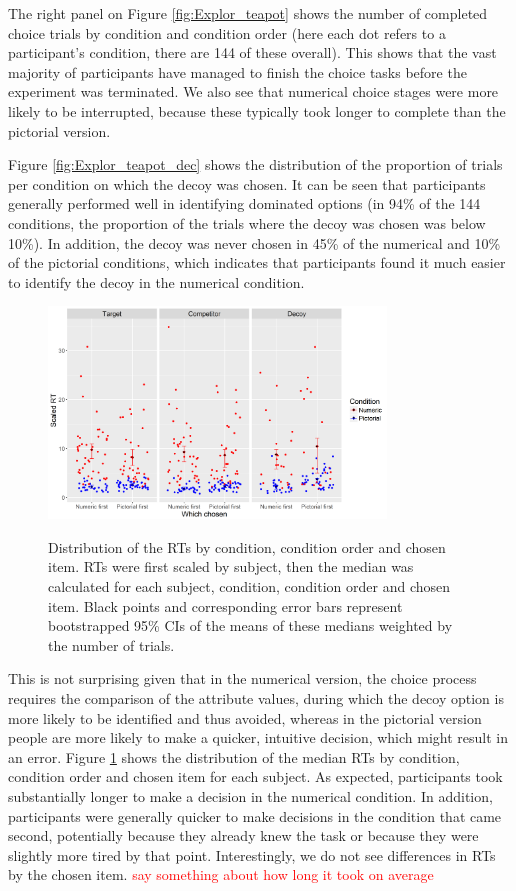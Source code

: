 \documentclass[11pt,a4paper]{article}
\begin{document}
The right panel on Figure \ref{fig:Explor_teapot} shows the number of completed choice trials by condition and condition order (here each dot refers to a participant's condition, there are 144 of these overall). This shows that the vast majority of participants have managed to finish the choice tasks before the experiment was terminated. We also see that numerical choice stages were more likely to be interrupted, because these typically took longer to complete than the pictorial version.



Figure \ref{fig:Explor_teapot_dec} shows the distribution of the proportion of trials per condition on which the decoy was chosen. It can be seen that participants generally performed well in identifying dominated options (in 94\% of the 144 conditions, the proportion of the trials where the decoy was chosen was below 10\%). In addition, the decoy was never chosen in 45\% of the numerical and 10\% of the pictorial conditions, which indicates that participants found it much easier to identify the decoy in the numerical condition.


 \begin{figure}
\centering
\caption{Distribution of the RTs by condition, condition order and chosen item. RTs were first scaled by subject, then the median was calculated for each subject, condition, condition order and chosen item. Black points and corresponding error bars represent bootstrapped 95\% CIs of the means of these medians weighted by the number of trials.}
\includegraphics[width=0.8\textwidth]{Teapot_rts.png}
\label{fig:Teapot_rts}
\end{figure} 

 This is not surprising given that in the numerical version, the choice process requires the comparison of the attribute values, during which the decoy option is more likely to be identified and thus avoided, whereas in the pictorial version people are more likely to make a quicker, intuitive decision, which might result in an error. Figure \ref{fig:Teapot_rts} shows the distribution of the median RTs by condition, condition order and chosen item for each subject. As expected, participants took substantially longer to make a decision in the numerical condition. In addition, participants were generally quicker to make decisions in the condition that came second, potentially because they already knew the task or because they were slightly more tired by that point. Interestingly, we do not see differences in RTs by the chosen item. \textcolor{red} {say something about how long it took on average}
\end{document}
